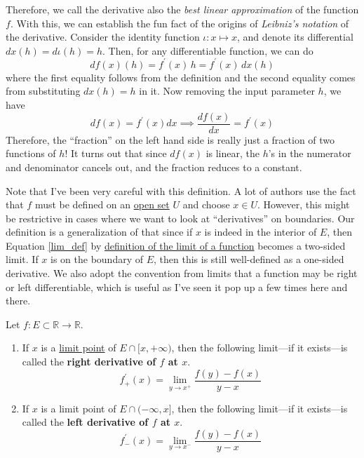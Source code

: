   Therefore, we call the derivative also the \textit{best linear approximation} of the function $f$. With this, we can establish the fun fact of the origins of \textit{Leibniz's notation} of the derivative. Consider the identity function $\iota: x \mapsto x$, and denote its differential $dx (h) = d\iota (h) = h$. Then, for any differentiable function, we can do 
  \begin{equation}
    df(x)(h) = f^\prime (x) \, h = f^\prime (x) \, dx(h)
  \end{equation}
  where the first equality follows from the definition and the second equality comes from substituting $dx(h) = h$ in it. Now removing the input parameter $h$, we have 
  \begin{equation}
    df(x) = f^\prime (x) dx \implies \frac{df(x)}{dx} = f^\prime (x)
  \end{equation}
  Therefore, the ``fraction'' on the left hand side is really just a fraction of two functions of $h$! It turns out that since $df(x)$ is linear, the $h$'s in the numerator and denominator cancels out, and the fraction reduces to a constant. 

  Note that I've been very careful with this definition. A lot of authors use the fact that $f$ must be defined on an \hyperref[pst-def:open-set]{open set} $U$ and choose $x \in U$. However, this might be restrictive in cases where we want to look at ``derivatives'' on boundaries. Our definition is a generalization of that since if $x$ is indeed in the interior of $E$, then Equation \ref{lim_def} by \hyperref[def:lim-func]{definition of the limit of a function} becomes a two-sided limit. If $x$ is on the boundary of $E$, then this is still well-defined as a one-sided derivative. We also adopt the convention from limits that a function may be right or left differentiable, which is useful as I've seen it pop up a few times here and there. 

  \begin{definition}
    \label{def:one-sided-derivative}
    Let $f: E \subset \mathbb{R} \to \mathbb{R}$. 
    \begin{enumerate}
      \item If $x$ is a \hyperref[pst-def:limit-point]{limit point} of $E \cap [x, +\infty)$, then the following limit---if it exists---is called the \textbf{right derivative of $f$ at $x$}. 
        \begin{equation}
          f^\prime_+ (x) = \lim_{y \to x^+} \frac{f(y) - f(x)}{y - x}
        \end{equation}

      \item If $x$ is a limit point of $E \cap (-\infty, x]$, then the following limit---if it exists---is called the \textbf{left derivative of $f$ at $x$}. 
        \begin{equation}
          f^\prime_- (x) = \lim_{y \to x^-} \frac{f(y) - f(x)}{y - x}
        \end{equation}
    \end{enumerate}
  \end{definition}

